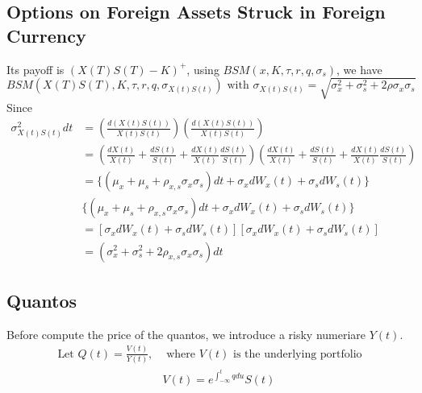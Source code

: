 \documentclass[a4]{article}
\begin{document}
\subsection{Options on Foreign Assets Struck in Foreign Currency}
Its payoff is $(X(T)S(T)-K)^{+}$, using $BSM(x,K,\tau,r,q,\sigma_{s})$, we have
$$
BSM(X(T)S(T),K,\tau,r, q,\sigma_{X(t)S(t)})\text{ with $\sigma_{X(t)S(t)}=\sqrt{\sigma_{x}^{2} + \sigma_{s}^{2}+2\rho\sigma_{x}\sigma_{s}}$}
$$
Since
$$
\begin{aligned}
\sigma_{X(t)S(t)}^{2}dt&=(\frac{d(X(t)S(t))}{X(t)S(t)})(\frac{d(X(t)S(t))}{X(t)S(t)})\\
&=(\frac{dX(t)}{X(t)}+\frac{dS(t)}{S(t)}+\frac{dX(t)}{X(t)}\frac{dS(t)}{S(t)})(\frac{dX(t)}{X(t)}+\frac{dS(t)}{S(t)}+\frac{dX(t)}{X(t)}\frac{dS(t)}{S(t)})\\
&=\{(\mu_{x}+\mu_{s}+\rho_{x,s}\sigma_{x}\sigma_{s})dt + \sigma_{x}dW_{x}(t)+\sigma_{s}dW_{s}(t)\}\\
&\{(\mu_{x}+\mu_{s}+\rho_{x,s}\sigma_{x}\sigma_{s})dt + \sigma_{x}dW_{x}(t)+\sigma_{s}dW_{s}(t)\}\\
&=\left[\sigma_{x}dW_{x}(t)+\sigma_{s}dW_{s}(t)\right]\left[\sigma_{x}dW_{x}(t)+\sigma_{s}dW_{s}(t)\right]\\
&=(\sigma_{x}^{2} + \sigma_{s}^{2}+2\rho_{x,s}\sigma_{x}\sigma_{s})dt
\end{aligned}
$$
\subsection{Quantos}
Before compute the price of the quantos, we introduce a risky numeriare $Y(t)$.
$$
\begin{aligned}
\text{Let }Q(t) = \frac{V(t)}{Y(t)},& \text{ where $V(t)$ is the underlying portfolio}\\
&V(t) = e^{\int_{-\infty}^{t}q du}S(t)
\end{aligned}
$$
\end{document}
